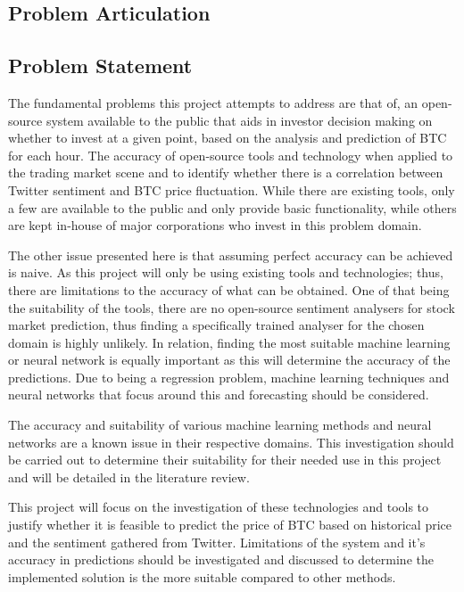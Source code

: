 \documentclass[oneside, 12pt]{article}
\begin{document}
	\newpage
	
	\begin{center}
		\section{Problem Articulation}\label{problem}
	\end{center}
		
		\subsection{Problem Statement}\label{statement}
		
		The fundamental problems this project attempts to address are that of, an open-source system available to the public that aids in investor decision making on whether to invest at a given point, based on the analysis and prediction of BTC for each hour. The accuracy of open-source tools and technology when applied to the trading market scene and to identify whether there is a correlation between Twitter sentiment and BTC price fluctuation. While there are existing tools, only a few are available to the public and only provide basic functionality, while others are kept in-house of major corporations who invest in this problem domain.
		
		The other issue presented here is that assuming perfect accuracy can be achieved is naive. As this project will only be using existing tools and technologies; thus, there are limitations to the accuracy of what can be obtained. One of that being the suitability of the tools, there are no open-source sentiment analysers for stock market prediction, thus finding a specifically trained analyser for the chosen domain is highly unlikely. In relation, finding the most suitable machine learning or neural network is equally important as this will determine the accuracy of the predictions. Due to being a regression problem, machine learning techniques and neural networks that focus around this and forecasting should be considered.
		
		The accuracy and suitability of various machine learning methods and neural networks are a known issue in their respective domains. This investigation should be carried out to determine their suitability for their needed use in this project and will be detailed in the literature review.
		
		This project will focus on the investigation of these technologies and tools to justify whether it is feasible to predict the price of BTC based on historical price and the sentiment gathered from Twitter. Limitations of the system and it's accuracy in predictions should be investigated and discussed to determine the implemented solution is the more suitable compared to other methods.  
		
\end{document}
